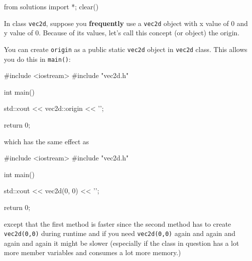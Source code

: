 \begin{python0}
from solutions import *; clear()
\end{python0}

In class \texttt{vec2d}, suppose you \textbf{frequently} use a
\texttt{vec2d} object with x value of 0 and y value of 0. Because of its
values, let's call this concept (or object) the origin.

You can create \texttt{origin} as a public static \texttt{vec2d} object in
\texttt{vec2d} class. This allows you do this in \texttt{main()}:

\begin{consolethree}[escapeinside=||]
#include <iostream>
#include "vec2d.h"

int main()
{
    std::cout << vec2d::origin << '\n';

    return 0;
}
\end{consolethree}

which has the same effect as

\begin{consolethree}[escapeinside=||]
#include <iostream>
#include "vec2d.h"

int main()
{
    std::cout << vec2d(0, 0) << '\n';

    return 0;
}
\end{consolethree}

except that the first method is faster since the second method has to
create \texttt{vec2d(0,0)} during runtime and if you need
\texttt{vec2d(0,0)} again and again and again and again it might be slower
(especially if the class in question has a lot more member variables and
consumes a lot more memory.)



